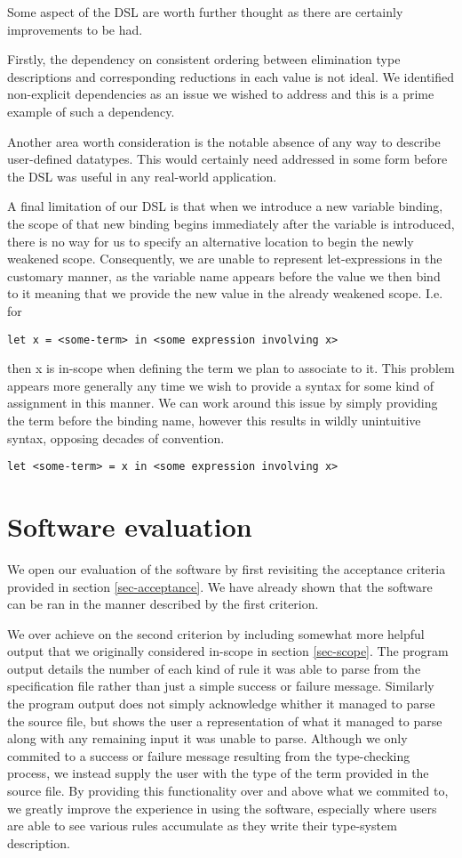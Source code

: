 Some aspect of the DSL are worth further thought as there are
certainly improvements to be had.

Firstly, the dependency on consistent ordering between elimination
type descriptions and corresponding reductions in each value is not
ideal. We identified non-explicit dependencies as an issue we wished to
address and this is a prime example of such a dependency.

Another area worth consideration is the notable absence of any way to
describe user-defined datatypes. This would certainly need addressed
in some form before the DSL was useful in any real-world application.

A final limitation of our DSL is that when we introduce a new variable
binding, the scope of that new binding begins immediately after the
variable is introduced, there is no way for us to specify an
alternative location to begin the newly weakened scope. Consequently,
we are unable to represent let-expressions in the customary manner, as
the variable name appears before the value we then bind to it meaning
that we provide the new value in the already weakened scope. I.e. for
\begin{verbatim}
let x = <some-term> in <some expression involving x>
\end{verbatim}
then x is in-scope when defining the term we plan to associate to
it. This problem appears more generally any time we wish to provide a
syntax for some kind of assignment in this manner. We can work around
this issue by simply providing the term before the binding name,
however this results in wildly unintuitive syntax, opposing decades of
convention.
\begin{verbatim}
let <some-term> = x in <some expression involving x>
\end{verbatim}

\section{Software evaluation}

We open our evaluation of the software by first revisiting the
acceptance criteria provided in section \ref{sec-acceptance}. We have
already shown that the software can be ran in the manner described by
the first criterion.

We over achieve on the second criterion by including somewhat more
helpful output that we originally considered in-scope in section
\ref{sec-scope}. The program output details the number of each kind of
rule it was able to parse from the specification file rather than just
a simple success or failure message. Similarly the program output does
not simply acknowledge whither it managed to parse the source file,
but shows the user a representation of what it managed to parse along
with any remaining input it was unable to parse. Although we
only commited to a success or failure message resulting from the
type-checking process, we instead supply the user with the type of the
term provided in the source file. By providing this functionality over
and above what we commited to, we greatly improve the experience in
using the software, especially where users are able to see various
rules accumulate as they write their type-system description.

